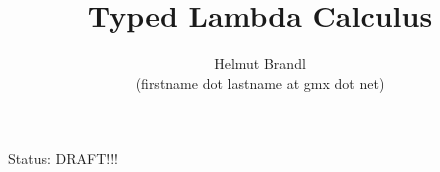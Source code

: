 \documentclass[12pt]{article}
\begin{document}
\title{Typed Lambda Calculus}
\author{Helmut Brandl \\ \scriptsize (firstname dot lastname at gmx dot net)}
\date{}


\maketitle

\abstract{
}

Status: DRAFT!!!

\tableofcontents

















\end{document}
